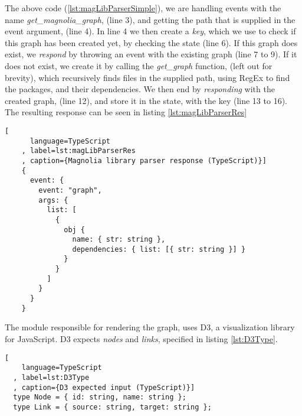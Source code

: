 The above code (\ref{lst:magLibParserSimple}), we are handling events with the name
\textit{get\_magnolia\_graph}, (line 3), and getting the path that is supplied in
the event argument, (line 4). In line 4 we then create a \textit{key}, which we
use to check if this graph has been created yet, by checking the state (line 6).
If this graph does exist, we \textit{respond} by throwing an event with the
existing graph (line 7 to 9). If it does not exist, we create it by calling the
\textit{get\_graph} function, (left out for brevity), which recursively finds
files in the supplied path, using RegEx to find the packages, and their
dependencies. We then end by \textit{responding} with the created graph,
(line 12), and store it in the state, with the key (line 13 to 16). The
resulting response can be seen in listing \ref{lst:magLibParserRes}

\begin{code}[H]
  \begin{lstlisting}[
      language=TypeScript
    , label=lst:magLibParserRes
    , caption={Magnolia library parser response (TypeScript)}]
    {
      event: {
        event: "graph",
        args: {
          list: [
            {
              obj {
                name: { str: string },
                dependencies: { list: [{ str: string }] }
              }
            }
          ]
        }
      }
    }
  \end{lstlisting}
\end{code}

The module responsible for rendering the graph, uses D3, a visualization library
for JavaScript. D3 expects \textit{nodes} and \textit{links}, specified in
listing \ref{lst:D3Type}.

\begin{lstlisting}[
    language=TypeScript
  , label=lst:D3Type
  , caption={D3 expected input (TypeScript)}]
  type Node = { id: string, name: string };
  type Link = { source: string, target: string };
\end{lstlisting}

